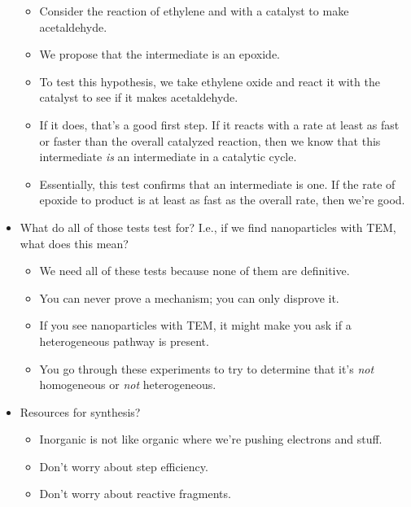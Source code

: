 \documentclass[../notes.tex]{subfiles}
\begin{document}
\begin{itemize}
\begin{center}
    \end{center}
    \begin{itemize}
        \item Consider the reaction of ethylene and  with a catalyst to make acetaldehyde.
        \item We propose that the intermediate is an epoxide.
        \item To test this hypothesis, we take ethylene oxide and react it with the catalyst to see if it makes acetaldehyde.
        \item If it does, that's a good first step. If it reacts with a rate at least as fast or faster than the overall catalyzed reaction, then we know that this intermediate \emph{is} an intermediate in a catalytic cycle.
        \item Essentially, this test confirms that an intermediate is one. If the rate of epoxide to product is at least as fast as the overall rate, then we're good.
    \end{itemize}
    \item What do all of those tests test for? I.e., if we find nanoparticles with TEM, what does this mean?
    \begin{itemize}
        \item We need all of these tests because none of them are definitive.
        \item You can never prove a mechanism; you can only disprove it.
        \item If you see nanoparticles with TEM, it might make you ask if a heterogeneous pathway is present.
        \item You go through these experiments to try to determine that it's \emph{not} homogeneous or \emph{not} heterogeneous.
    \end{itemize}
    \item Resources for synthesis?
    \begin{itemize}
        \item Inorganic is not like organic where we're pushing electrons and stuff.
        \item Don't worry about step efficiency.
        \item Don't worry about reactive fragments.

\end{itemize}
\end{itemize}
\end{document}
